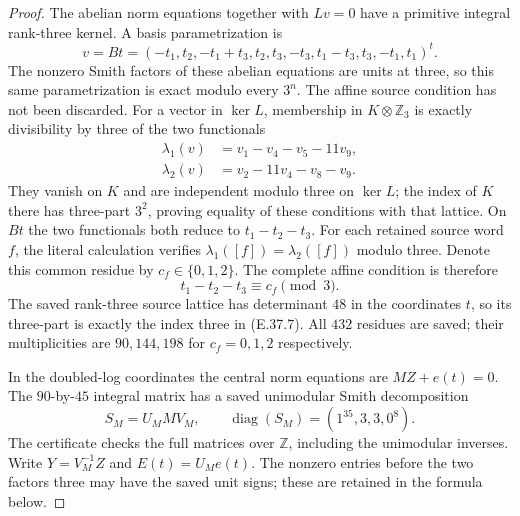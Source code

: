 \begin{proof}
The abelian norm equations together with
$Lv=0$ have a primitive integral rank-three
kernel.  A basis parametrization is
\[
 v=B t=
 (-t_1,t_2,-t_1+t_3,t_2,t_3,-t_3,
          t_1-t_3,t_3,-t_1,t_1)^t .
 \tag{E.37.5}
\]
The nonzero Smith factors of these abelian
equations are units at three, so this same
parametrization is exact modulo every $3^n$.
The affine source condition has not been
discarded.  For a vector in $\ker L$, membership
in $K\otimes\mathbb Z_3$ is exactly divisibility
by three of the two functionals
\[
 \begin{split}
 \lambda_1(v)&=v_1-v_4-v_5-11v_9,\\
 \lambda_2(v)&=v_2-11v_4-v_8-v_9.
 \end{split}
 \tag{E.37.6}
\]
They vanish on $K$ and are independent modulo
three on $\ker L$; the index of $K$ there has
three-part $3^2$, proving equality of these
conditions with that lattice.
On $Bt$ the two functionals both reduce to
$t_1-t_2-t_3$.
For each retained source word $f$, the literal
calculation verifies
$\lambda_1([f])=\lambda_2([f])$ modulo three.
Denote this common residue by $c_f\in\{0,1,2\}$.
The complete affine condition is therefore
\[
                     t_1-t_2-t_3\equiv c_f\pmod3 .
 \tag{E.37.7}
\]
The saved rank-three source lattice has determinant
$48$ in the coordinates $t$, so its three-part is
exactly the index three in \textup{(E.37.7)}.
All $432$ residues are saved; their multiplicities
are $90,144,198$ for $c_f=0,1,2$ respectively.

In the doubled-log coordinates the central norm
equations are $MZ+e(t)=0$.
The $90$-by-$45$ integral matrix has a saved
unimodular Smith decomposition
\[
       S_M=U_M M V_M,\qquad
       \operatorname{diag}(S_M)
                     =(1^{35},3,3,0^8).
 \tag{E.37.8}
\]
The certificate checks the full matrices over
$\mathbb Z$, including the unimodular inverses.
Write $Y=V_M^{-1}Z$ and $E(t)=U_Me(t)$.
The nonzero entries before the two factors
three may have the saved unit signs; these
are retained in the formula below.


\end{proof}
